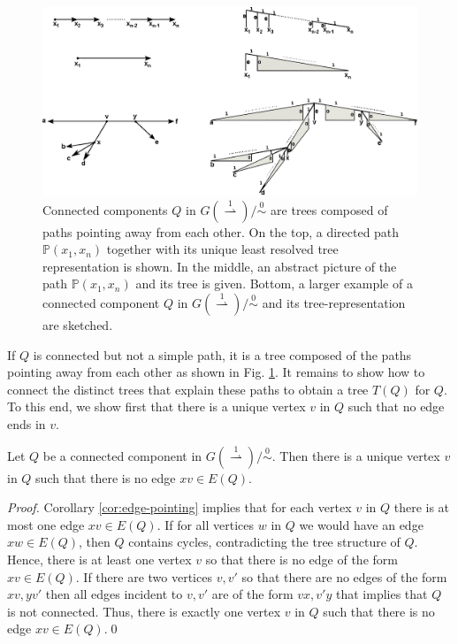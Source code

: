\documentclass[smallextended]{svjour3}
\newcommand{\Ro}{\mathrel{\overset{0}{\sim}}}
\newcommand{\Rld}{\mathrel{\overset{1}{\rightharpoonup}}}
\begin{document}
\begin{figure}
\begin{center}
\includegraphics[width=1.\textwidth]{di-path-tree.eps}
\end{center}
\caption{Connected components $Q$ in $G(\Rld)/\Ro$ are trees composed of
  paths pointing away from each other.  On the top, a directed path
  $\mathbb P(x_1,x_n)$ together with its unique least resolved tree
  representation is shown. In the middle, an abstract picture of the path
  $\mathbb P(x_1,x_n)$ and its tree is given.  Bottom, a larger example of
  a connected component $Q$ in $G(\Rld)/\Ro$ and its tree-representation
  are sketched.}
\label{fig:Qtree}
\end{figure}

If $Q$ is connected but not a simple path, it is a tree composed of the
paths pointing away from each other as shown in Fig. \ref{fig:Qtree}. It
remains to show how to connect the distinct trees that explain these paths
to obtain a tree $T(Q)$ for $Q$.  To this end, we show first that there is
a unique vertex $v$ in $Q$ such that no edge ends in $v$.

\begin{lemma}
  Let $Q$ be a connected component in $G(\Rld)/\Ro$.  Then there is a
  unique vertex $v$ in $Q$ such that there is no edge $xv\in E(Q)$.
  \label{lem:unique-v}
\end{lemma}
\begin{proof}
  Corollary \ref{cor:edge-pointing} implies that for each vertex $v$ in $Q$
  there is at most one edge $xv\in E(Q)$.  If for all vertices $w$ in $Q$
  we would have an edge $xw\in E(Q)$, then $Q$ contains cycles,
  contradicting the tree structure of $Q$. Hence, there is at least one
  vertex $v$ so that there is no edge of the form $xv\in E(Q)$.  If there
  are two vertices $v,v'$ so that there are no edges of the form $xv, yv'$
  then all edges incident to $v,v'$ are of the form $vx, v'y$ that implies
  that $Q$ is not connected. Thus, there is exactly one vertex $v$ in $Q$
  such that there is no edge $xv\in E(Q)$.\qed
\end{proof}
\end{document}
